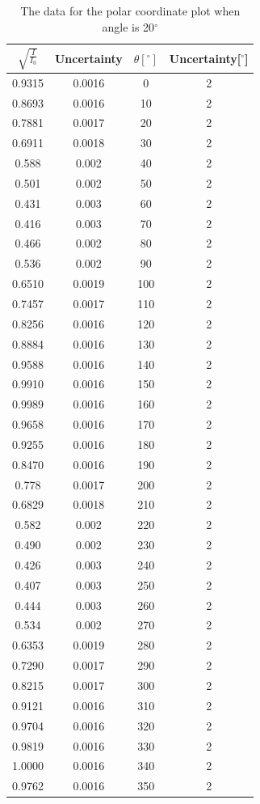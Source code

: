 \documentclass{my_template}
\begin{document}
    \begin{table}[!ht]
        \centering
        \begin{tabular}{|c|c|c|c|}
            \hline
            $\sqrt{\frac{I}{I_0}}$&Uncertainty&$\theta[^\circ]$&Uncertainty[$^\circ$]\\\hline
            0.9315&0.0016&0&2\\\hline
            0.8693&0.0016&10&2\\\hline
            0.7881&0.0017&20&2\\\hline
            0.6911&0.0018&30&2\\\hline
            0.588&0.002&40&2\\\hline
            0.501&0.002&50&2\\\hline
            0.431&0.003&60&2\\\hline
            0.416&0.003&70&2\\\hline
            0.466&0.002&80&2\\\hline
            0.536&0.002&90&2\\\hline
            0.6510&0.0019&100&2\\\hline
            0.7457&0.0017&110&2\\\hline
            0.8256&0.0016&120&2\\\hline
            0.8884&0.0016&130&2\\\hline
            0.9588&0.0016&140&2\\\hline
            0.9910&0.0016&150&2\\\hline
            0.9989&0.0016&160&2\\\hline
            0.9658&0.0016&170&2\\\hline
            0.9255&0.0016&180&2\\\hline
            0.8470&0.0016&190&2\\\hline
            0.778&0.0017&200&2\\\hline
            0.6829&0.0018&210&2\\\hline
            0.582&0.002&220&2\\\hline
            0.490&0.002&230&2\\\hline
            0.426&0.003&240&2\\\hline
            0.407&0.003&250&2\\\hline
            0.444&0.003&260&2\\\hline
            0.534&0.002&270&2\\\hline
            0.6353&0.0019&280&2\\\hline
            0.7290&0.0017&290&2\\\hline
            0.8215&0.0017&300&2\\\hline
            0.9121&0.0016&310&2\\\hline
            0.9704&0.0016&320&2\\\hline
            0.9819&0.0016&330&2\\\hline
            1.0000&0.0016&340&2\\\hline
            0.9762&0.0016&350&2\\\hline
        \end{tabular}
        \caption{The data for the polar coordinate plot when angle is 20$^\circ$}
        \label{tab:plot20}
    \end{table}
\end{document}
